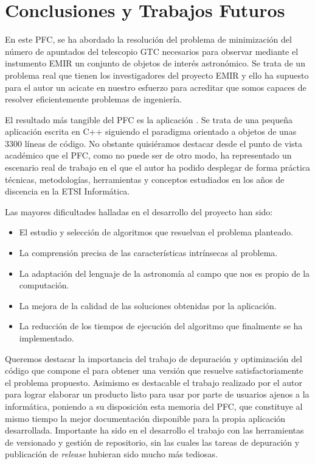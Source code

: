 %
%
%
%

\chapter{Conclusiones y Trabajos Futuros} \label{chap:conclusions}
En este PFC, se ha abordado la resolución del problema de minimización del número de apuntados
del telescopio GTC necesarios para observar mediante el instumento EMIR un conjunto de objetos
de interés astronómico.
Se trata de un problema real que tienen los investigadores del proyecto EMIR y ello ha supuesto para
el autor un acicate en nuestro esfuerzo para acreditar que somos capaces de resolver eficientemente
problemas de ingeniería.

El resultado más tangible del PFC es la aplicación \CSUO{}. 
Se trata de una pequeña aplicación escrita en C++ siguiendo el paradigma orientado a objetos de unas
3300 líneas de código.
No obstante quisiéramos destacar desde el punto de vista académico que el PFC, como no puede ser de otro modo, 
ha representado un escenario real de trabajo en el que el autor ha
podido desplegar de forma práctica técnicas, metodologías, herramientas y conceptos estudiados en los años de discencia en la ETSI Informática.

Las mayores dificultades halladas en el desarrollo del proyecto han sido:
\begin{itemize}
\item El estudio y selección de algoritmos que resuelvan el problema planteado.
\item La comprensión precisa de las características intrínsecas al problema.
\item La adaptación del lenguaje de la astronomía al campo que nos es propio de la computación.
\item La mejora de la calidad de las soluciones obtenidas por la aplicación.
\item La reducción de los tiempos de ejecución del algoritmo que finalmente se ha implementado.
\end{itemize}
Queremos destacar la importancia del trabajo de depuración y optimización del código que
compone el \CSUO{} para obtener una versión que resuelve satisfactoriamente el problema propuesto.
Asimismo es destacable el trabajo realizado por el autor para lograr elaborar un producto listo para usar 
por parte de usuarios ajenos a la informática, poniendo a su disposición esta memoria del PFC, que constituye
al mismo tiempo la mejor documentación disponible para la propia aplicación desarrollada.
Importante ha sido en el desarrollo el trabajo con las
herramientas de versionado y gestión de repositorio, sin las cuales las tareas de
depuración y publicación de \textit{release} hubieran sido mucho más tediosas.

